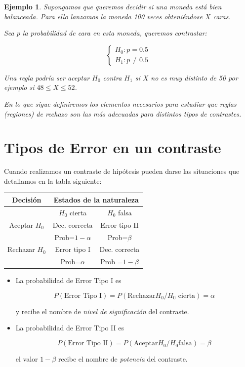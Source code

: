 \documentclass[12pt]{report}
\newtheorem{example}[definition]{Ejemplo}
\begin{document}
\begin{example}

Supongamos que queremos decidir si una moneda está bien balanceada. Para ello lanzamos la
moneda 100 veces obteniéndose $X$ caras.

Sea $p$ la probabilidad de cara en esta moneda, queremos contrastar:


$$\left\{\begin{array}{ll} H_{0}:p=0.5\\ H_{1}:p\not=0.5
\end{array}\right.$$

Una regla podría ser aceptar $H_{0}$ contra $H_{1}$ si $X$ no es muy distinto de 50 por
ejemplo si $48\leq X\leq 52$.

En lo que sigue definiremos los elementos necesarios para estudiar que reglas (regiones)
de rechazo son las más adecuadas para distintos tipos de contrastes.
\end{example}

    \section{Tipos de Error en un contraste}

    Cuando realizamos un contraste de hipótesis pueden darse las
    situaciones que detallamos en la tabla siguiente:
\begin{center}
    \begin{tabular}{c|c|c}
    Decisión  & \multicolumn{2}{c}{Estados de la naturaleza} \\
    \hline\hline
     & $H_{0}$ cierta & $H_{0}$ falsa\\
     \hline
    Aceptar $H_{0}$ & Dec. correcta  &  Error tipo II \\
    & Prob=$1-\alpha$ & Prob=$\beta$\\
    \hline
    Rechazar $H_{0}$ & Error tipo I  & Dec. correcta \\
    &Prob=$\alpha$ & Prob =$1-\beta$\\
\hline
    \end{tabular}
\end{center}

\begin{itemize}
\item La probabilidad de Error Tipo I es

$$P(\mbox{Error Tipo I})=P(\mbox{Rechazar} H_{0}/H_{0} \mbox{ cierta})=\alpha$$

y recibe el nombre de \emph{nivel de significación} del contraste.

\item La probabilidad de Error Tipo II es

$$P(\mbox{Error Tipo II})=P(\mbox{Aceptar} H_{0}/H_{0} \mbox{falsa})=\beta$$

el valor $1-\beta$ recibe el nombre de \emph{potencia} del contraste.
\end{itemize}
\end{document}
